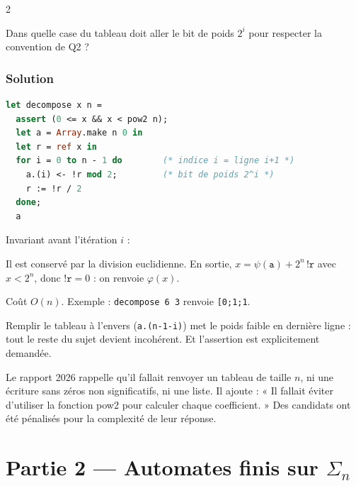 \documentclass[11pt,a4paper]{article}
\newcommand{\equationajustee}[1]{%
  \sbox{\boiteequation}{$\displaystyle #1$}%
  \ifdim\wd\boiteequation>\linewidth
    \[\resizebox{\linewidth}{!}{\usebox{\boiteequation}}\]%
  \else
    \[#1\]%
  \fi}
\begin{document}
\begin{indication}{2}

Dans quelle case du tableau doit aller le bit de poids \(2^i\) pour respecter la convention de Q2 ?

\end{indication}

\hypertarget{solution-2}{%
\subsubsection{Solution}\label{solution-2}}

\begin{lstlisting}[language=Caml]
let decompose x n =
  assert (0 <= x && x < pow2 n);
  let a = Array.make n 0 in
  let r = ref x in
  for i = 0 to n - 1 do        (* indice i = ligne i+1 *)
    a.(i) <- !r mod 2;         (* bit de poids 2^i *)
    r := !r / 2
  done;
  a
\end{lstlisting}

Invariant avant l'itération \(i\) :

\equationajustee{x=\sum_{j<i}2^j\,\texttt{a.(j)}+2^i\,\texttt{!r}.}

Il est conservé par la division euclidienne. En sortie, \(x=\psi(\texttt{a})+2^n\,\texttt{!r}\) avec \(x<2^n\), donc \(\texttt{!r}=0\) : on renvoie \(\varphi(x)\).

Coût \(O(n)\). Exemple : \texttt{decompose\ 6\ 3} renvoie \texttt{{[}\textbar{}0;1;1\textbar{}{]}}.

\begin{piege}

Remplir le tableau à l'envers (\texttt{a.(n-1-i)}) met le poids faible en dernière ligne : tout le reste du sujet devient incohérent. Et l'assertion est explicitement demandée.

\end{piege}

\begin{jury}

Le rapport 2026 rappelle qu'il fallait renvoyer un tableau de taille \(n\), ni une écriture sans zéros non significatifs, ni une liste. Il ajoute : « Il fallait éviter d'utiliser la fonction pow2 pour calculer chaque coefficient. » Des candidats ont été pénalisés pour la complexité de leur réponse.

\end{jury}

\hypertarget{partie-2-automates-finis-sur-sigma_n}{%
\section{\texorpdfstring{Partie 2 --- Automates finis sur \(\Sigma_n\)}{Partie 2 --- Automates finis sur \textbackslash Sigma\_n}}\label{partie-2-automates-finis-sur-sigma_n}}
\end{document}
